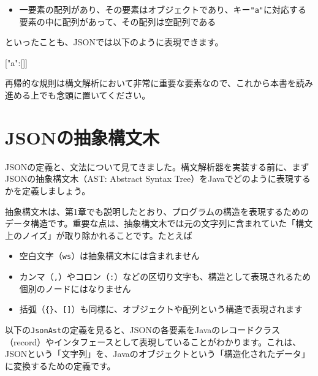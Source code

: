 \begin{itemize}
\item
  一要素の配列があり、その要素はオブジェクトであり、キー\texttt{"a"}に対応する要素の中に配列があって、その配列は空配列である
\end{itemize}

\noindent といったことも、JSONでは以下のように表現できます。

\begin{codescreen}{}
[{"a":[]}]
\end{codescreen}


再帰的な規則は構文解析において非常に重要な要素なので、これから本書を読み進める上でも念頭に置いてください。

\section{JSONの抽象構文木}

JSONの定義と、文法について見てきました。構文解析器を実装する前に、まずJSONの抽象構文木（AST:
Abstract Syntax Tree）をJavaでどのように表現するかを定義しましょう。

抽象構文木は、第1章でも説明したとおり、プログラムの構造を表現するためのデータ構造です。重要な点は、抽象構文木では元の文字列に含まれていた「構文上のノイズ」が取り除かれることです。たとえば

\begin{itemize}
\item
  空白文字（\texttt{ws}）は抽象構文木には含まれません
\item
  カンマ（\texttt{,}）やコロン（\texttt{:}）などの区切り文字も、構造として表現されるため個別のノードにはなりません
\item
  括弧（\texttt{\{\}}、\texttt{{[}{]}}）も同様に、オブジェクトや配列という構造で表現されます
\end{itemize}

以下の\texttt{JsonAst}の定義を見ると、JSONの各要素をJavaのレコードクラス（record）やインタフェースとして表現していることがわかります。これは、JSONという「文字列」を、Javaのオブジェクトという「構造化されたデータ」に変換するための定義です。

